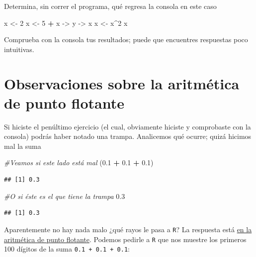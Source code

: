 \documentclass[
]{book}
\newenvironment{Shaded}{\begin{snugshade}}{\end{snugshade}}
\newcommand{\CommentTok}[1]{\textcolor[rgb]{0.56,0.35,0.01}{\textit{#1}}}
\newcommand{\DecValTok}[1]{\textcolor[rgb]{0.00,0.00,0.81}{#1}}
\newcommand{\FloatTok}[1]{\textcolor[rgb]{0.00,0.00,0.81}{#1}}
\newcommand{\NormalTok}[1]{#1}
\newcommand{\OperatorTok}[1]{\textcolor[rgb]{0.81,0.36,0.00}{\textbf{#1}}}
\newcommand{\StringTok}[1]{\textcolor[rgb]{0.31,0.60,0.02}{#1}}
\begin{document}
Determina, sin correr el programa, qué regresa la consola en este caso

\begin{Shaded}
\begin{Highlighting}[]
\NormalTok{x <-}\StringTok{ }\DecValTok{2} 
\NormalTok{x <-}\StringTok{ }\DecValTok{5} \OperatorTok{+}\StringTok{ }\NormalTok{x ->}\StringTok{ }\NormalTok{y ->}\StringTok{ }\NormalTok{x}
\NormalTok{x <-}\StringTok{ }\NormalTok{x}\OperatorTok{^}\DecValTok{2}
\NormalTok{x}
\end{Highlighting}
\end{Shaded}

Comprueba con la consola tus resultados; puede que encuentres respuestas poco intuitivas.

\hypertarget{observaciones-sobre-la-aritmuxe9tica-de-punto-flotante}{%
\section{Observaciones sobre la aritmética de punto flotante}\label{observaciones-sobre-la-aritmuxe9tica-de-punto-flotante}}

Si hiciste el penúltimo ejercicio (el cual, obviamente hiciste y comprobaste con la consola) podrás haber notado una trampa. Analicemos qué ocurre; quizá hicimos mal la suma

\begin{Shaded}
\begin{Highlighting}[]
\CommentTok{#Veamos si este lado está mal}
\NormalTok{(}\FloatTok{0.1} \OperatorTok{+}\StringTok{ }\FloatTok{0.1} \OperatorTok{+}\StringTok{ }\FloatTok{0.1}\NormalTok{)}
\end{Highlighting}
\end{Shaded}

\begin{verbatim}
## [1] 0.3
\end{verbatim}

\begin{Shaded}
\begin{Highlighting}[]
\CommentTok{#O si éste es el que tiene la trampa}
\FloatTok{0.3}
\end{Highlighting}
\end{Shaded}

\begin{verbatim}
## [1] 0.3
\end{verbatim}

Aparentemente no hay nada malo ¿qué rayos le pasa a \texttt{R}? La respuesta está \href{https://www.youtube.com/watch?v=PZRI1IfStY0}{en la aritmética de punto flotante}. Podemos pedirle a \texttt{R} que nos muestre los primeros 100 dígitos de la suma \texttt{0.1\ +\ 0.1\ +\ 0.1}:
\end{document}
